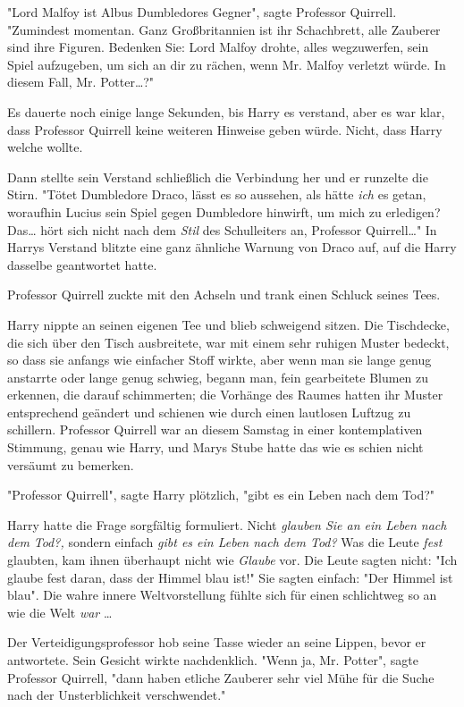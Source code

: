 {"Lord Malfoy ist Albus Dumbledores Gegner", sagte Professor Quirrell. "Zumindest momentan. Ganz Großbritannien ist ihr Schachbrett, alle Zauberer sind ihre Figuren. Bedenken Sie: Lord Malfoy drohte, alles wegzuwerfen, sein Spiel aufzugeben, um sich an dir zu rächen, wenn Mr. Malfoy verletzt würde. In diesem Fall, Mr. Potter…?"

Es dauerte noch einige lange Sekunden, bis Harry es verstand, aber es war klar, dass Professor Quirrell keine weiteren Hinweise geben würde. Nicht, dass Harry welche wollte.

Dann stellte sein Verstand schließlich die Verbindung her und er runzelte die Stirn. "Tötet Dumbledore Draco, lässt es so aussehen, als hätte \emph{ich} es getan, woraufhin Lucius sein Spiel gegen Dumbledore hinwirft, um mich zu erledigen? Das… hört sich nicht nach dem \emph{Stil} des Schulleiters an, Professor Quirrell…" In Harrys Verstand blitzte eine ganz ähnliche Warnung von Draco auf, auf die Harry dasselbe geantwortet hatte.

Professor Quirrell zuckte mit den Achseln und trank einen Schluck seines Tees.

Harry nippte an seinen eigenen Tee und blieb schweigend sitzen. Die Tischdecke, die sich über den Tisch ausbreitete, war mit einem sehr ruhigen Muster bedeckt, so dass sie anfangs wie einfacher Stoff wirkte, aber wenn man sie lange genug anstarrte oder lange genug schwieg, begann man, fein gearbeitete Blumen zu erkennen, die darauf schimmerten; die Vorhänge des Raumes hatten ihr Muster entsprechend geändert und schienen wie durch einen lautlosen Luftzug zu schillern. Professor Quirrell war an diesem Samstag in einer kontemplativen Stimmung, genau wie Harry, und Marys Stube hatte das wie es schien nicht versäumt zu bemerken.

"Professor Quirrell", sagte Harry plötzlich, "gibt es ein Leben nach dem Tod?"

Harry hatte die Frage sorgfältig formuliert. Nicht \emph{glauben Sie an ein Leben nach dem} \emph{Tod?,} sondern einfach \emph{gibt es ein Leben nach dem Tod?} Was die Leute \emph{fest} glaubten, kam ihnen überhaupt nicht wie \emph{Glaube} vor. Die Leute sagten nicht: "Ich glaube fest daran, dass der Himmel blau ist!" Sie sagten einfach: "Der Himmel ist blau". Die wahre innere Weltvorstellung fühlte sich für einen schlichtweg so an wie die Welt \emph{war} …

Der Verteidigungsprofessor hob seine Tasse wieder an seine Lippen, bevor er antwortete. Sein Gesicht wirkte nachdenklich. "Wenn ja, Mr. Potter", sagte Professor Quirrell, "dann haben etliche Zauberer sehr viel Mühe für die Suche nach der Unsterblichkeit verschwendet."

}
